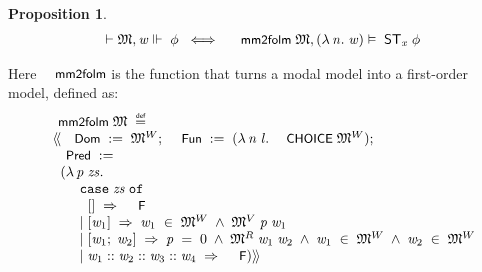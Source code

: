 \documentclass{llncs}
\newtheorem{prop}[thm]{Proposition}
\newenvironment{holmath}{\begin{displaymath}\begin{array}{l}}{\end{array}\end{displaymath}\ignorespacesafterend}
\renewcommand{\HOLConst}[1]{{\textsf{\upshape\small #1}}}
\renewcommand{\HOLinline}[1]{\ensuremath{#1}}
\renewcommand{\HOLFieldName}[1]{\HOLConst{#1}}
\renewcommand{\HOLTokenLeftrec}{\ensuremath{\langle\!\langle}}
\renewcommand{\HOLTokenRightrec}{\ensuremath{\rangle\!\rangle}}
\renewcommand{\HOLKeyword}[1]{\texttt{\upshape #1}}
\renewcommand{\HOLTokenBar}{\mbox{$|$}}
\begin{document}
\begin{prop}\label{2.47}
{\upshape\cite[Theorem 2.47 (i)]{Blackburn}}
\begin{holmath}
  \ensuremath{\HOLTokenTurnstile}\HOLFreeVar{\ensuremath{\mathfrak{M}}},\HOLFreeVar{w}\ensuremath{\Vdash}\;\HOLFreeVar{\ensuremath{\phi}}\;\HOLSymConst{\HOLTokenEquiv{}}\;\HOLConst{mm2folm}\;\HOLFreeVar{\ensuremath{\mathfrak{M}}},(\HOLTokenLambda{}\HOLBoundVar{n}.\;\HOLFreeVar{w})\ensuremath{\vDash}\;{\sf ST}\sb{\HOLFreeVar{x}}\;\HOLFreeVar{\ensuremath{\phi}}
\end{holmath}
\end{prop} 
Here \HOLinline{\HOLConst{mm2folm}} is the function that turns a modal model into a first-order model, defined as:
\begin{holmath}
  \HOLConst{mm2folm}\;\HOLFreeVar{\ensuremath{\mathfrak{M}}}\;\HOLTokenDefEquality{}\\
\;\;\HOLTokenLeftrec{}\HOLFieldName{Dom}\;:=\;\HOLFreeVar{\ensuremath{\mathfrak{M}}}\HOLSymConst{\ensuremath{\sp{W}}};\;\HOLFieldName{Fun}\;:=\;(\HOLTokenLambda{}\HOLBoundVar{n}\;\HOLBoundVar{l}.\;\HOLConst{CHOICE}\;\HOLFreeVar{\ensuremath{\mathfrak{M}}}\HOLSymConst{\ensuremath{\sp{W}}});\\
\;\;\HOLFieldName{Pred}\;:=\\
\;\;\;\;(\HOLTokenLambda{}\HOLBoundVar{p}\;\HOLBoundVar{zs}.\\
\;\;\;\;\;\;\;\;\;\HOLKeyword{case}\;\HOLBoundVar{zs}\;\HOLKeyword{of}\\
\;\;\;\;\;\;\;\;\;\;\;[]\;\HOLTokenImp{}\;\HOLConst{F}\\
\;\;\;\;\;\;\;\;\;\HOLTokenBar{}\;[\HOLBoundVar{w}\sb{\mathrm{1}}]\;\HOLTokenImp{}\;\HOLBoundVar{w}\sb{\mathrm{1}}\;\HOLSymConst{\HOLTokenIn{}}\;\HOLFreeVar{\ensuremath{\mathfrak{M}}}\HOLSymConst{\ensuremath{\sp{W}}}\;\HOLSymConst{\HOLTokenConj{}}\;\HOLFreeVar{\ensuremath{\mathfrak{M}}}\HOLSymConst{\ensuremath{\sp{V}}}\;\HOLBoundVar{p}\;\HOLBoundVar{w}\sb{\mathrm{1}}\\
\;\;\;\;\;\;\;\;\;\HOLTokenBar{}\;[\HOLBoundVar{w}\sb{\mathrm{1}};\;\HOLBoundVar{w}\sb{\mathrm{2}}]\;\HOLTokenImp{}\;\HOLBoundVar{p}\;\HOLSymConst{=}\;\HOLNumLit{0}\;\HOLSymConst{\HOLTokenConj{}}\;\HOLFreeVar{\ensuremath{\mathfrak{M}}}\HOLSymConst{\ensuremath{\sp{R}}}\;\HOLBoundVar{w}\sb{\mathrm{1}}\;\HOLBoundVar{w}\sb{\mathrm{2}}\;\HOLSymConst{\HOLTokenConj{}}\;\HOLBoundVar{w}\sb{\mathrm{1}}\;\HOLSymConst{\HOLTokenIn{}}\;\HOLFreeVar{\ensuremath{\mathfrak{M}}}\HOLSymConst{\ensuremath{\sp{W}}}\;\HOLSymConst{\HOLTokenConj{}}\;\HOLBoundVar{w}\sb{\mathrm{2}}\;\HOLSymConst{\HOLTokenIn{}}\;\HOLFreeVar{\ensuremath{\mathfrak{M}}}\HOLSymConst{\ensuremath{\sp{W}}}\\
\;\;\;\;\;\;\;\;\;\HOLTokenBar{}\;\HOLBoundVar{w}\sb{\mathrm{1}}\HOLSymConst{::}\HOLBoundVar{w}\sb{\mathrm{2}}\HOLSymConst{::}\HOLBoundVar{w}\sb{\mathrm{3}}\HOLSymConst{::}\HOLBoundVar{w}\sb{\mathrm{4}}\;\HOLTokenImp{}\;\HOLConst{F})\HOLTokenRightrec{}
\end{holmath}
\end{document}
